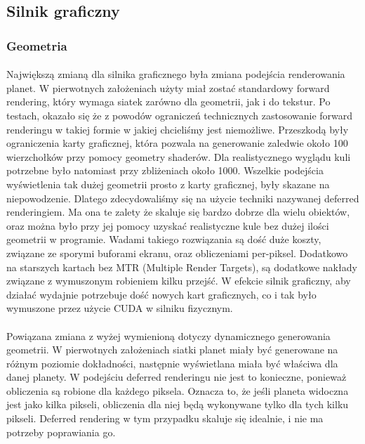 \subsection{Silnik graficzny}\label{sub:silnik graficzny}
\subsubsection{Geometria}\label{ssub:geometria}
\paragraph{}

Największą zmianą dla silnika graficznego była zmiana podejścia renderowania planet. W pierwotnych założeniach użyty miał zostać standardowy forward rendering, który wymaga siatek zarówno dla geometrii, jak i do tekstur. Po testach, okazało się że z powodów ograniczeń technicznych zastosowanie forward renderingu w takiej formie w jakiej chcieliśmy jest niemożliwe. Przeszkodą były ograniczenia karty graficznej, która pozwala na generowanie zaledwie około 100 wierzchołków przy pomocy geometry shaderów. Dla realistycznego wyglądu kuli potrzebne było natomiast przy zbliżeniach około 1000. Wszelkie podejścia wyświetlenia tak dużej geometrii prosto z karty graficznej, były skazane na niepowodzenie. Dlatego zdecydowaliśmy się na użycie techniki nazywanej deferred renderingiem. Ma ona te zalety że skaluje się bardzo dobrze dla wielu obiektów, oraz można było przy jej pomocy uzyskać realistyczne kule bez dużej ilości geometrii w programie. Wadami takiego rozwiązania są dość duże koszty, związane ze sporymi buforami ekranu, oraz obliczeniami per-piksel. Dodatkowo na starszych kartach bez MTR (Multiple Render Targets), są dodatkowe nakłady związane z wymuszonym robieniem kilku przejść. W efekcie silnik graficzny, aby działać wydajnie potrzebuje dość nowych kart graficznych, co i tak było wymuszone przez użycie CUDA w silniku fizycznym.

\paragraph{}

Powiązana zmiana z wyżej wymienioną dotyczy dynamicznego generowania geometrii. W pierwotnych założeniach siatki planet miały być generowane na różnym poziomie dokładności, następnie wyświetlana miała być właściwa dla danej planety. W podejściu deferred renderingu nie jest to konieczne, ponieważ obliczenia są robione dla każdego piksela. Oznacza to, że jeśli planeta widoczna jest jako kilka pikseli, obliczenia dla niej będą wykonywane tylko dla tych kilku pikseli. Deferred rendering w tym przypadku skaluje się idealnie, i nie ma potrzeby poprawiania go.

